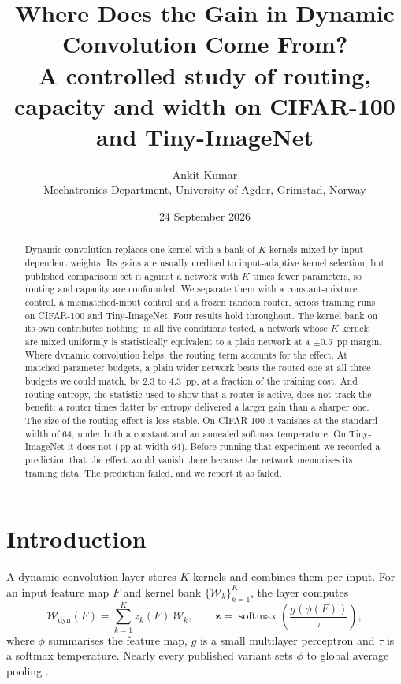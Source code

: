 \documentclass[10pt,a4paper]{article}
\title{\vspace{-1.3cm}\textbf{Where Does the Gain in Dynamic Convolution Come From?}\\[3pt]
\large A controlled study of routing, capacity and width on CIFAR-100 and Tiny-ImageNet}
\author{Ankit Kumar\\\small Mechatronics Department, University of Agder, Grimstad, Norway}
\date{\small 24 September 2026}
\newcommand{\zv}{\mathbf{z}}
\begin{document}
\maketitle
\vspace{-0.6cm}

\begin{abstract}
\noindent
Dynamic convolution replaces one kernel with a bank of $K$ kernels mixed
by input-dependent weights. Its gains are usually credited to
input-adaptive kernel selection, but published comparisons set it
against a network with $K$ times fewer parameters, so routing and
capacity are confounded. We separate them with a constant-mixture
control, a mismatched-input control and a frozen random router, across
 training runs on CIFAR-100 and Tiny-ImageNet. Four results hold
throughout. The kernel bank on its own contributes nothing: in all five
conditions tested, a network whose $K$ kernels are mixed uniformly is
statistically equivalent to a plain network at a $\pm$\SI{0.5}{pp}
margin. Where dynamic convolution helps, the routing term accounts for
the effect. At matched parameter budgets, a plain wider network beats the
routed one at all three budgets we could match, by 2.3 to
\SI{4.3}{pp}, at a fraction of the training cost. And routing entropy,
the statistic used to show that a router is active, does not track the
benefit: a router  times flatter by entropy delivered a larger gain
than a sharper one. The size of the routing effect is less stable. On
CIFAR-100 it vanishes at the standard width of 64, under both a constant
and an annealed softmax temperature. On Tiny-ImageNet it does not
(\,pp at width 64). Before running that experiment we recorded
a prediction that the effect would vanish there because the network
memorises its training data. The prediction failed, and we report it as
failed.
\end{abstract}

\section{Introduction}

A dynamic convolution layer stores $K$ kernels and combines them per
input. For an input feature map $F$ and kernel bank
$\{\mathcal{W}_k\}_{k=1}^{K}$, the layer computes
\begin{equation}
\mathcal{W}_{\text{dyn}}(F)=\sum_{k=1}^{K} z_k(F)\,\mathcal{W}_k,
\qquad
\zv=\operatorname{softmax}\!\left(\frac{g(\phi(F))}{\tau}\right),
\label{eq:dynconv}
\end{equation}
where $\phi$ summarises the feature map, $g$ is a small multilayer
perceptron and $\tau$ is a softmax temperature. Nearly every published
variant sets $\phi$ to global average pooling
\citep{yang2019condconv,chen2020dynamic}.
\end{document}
